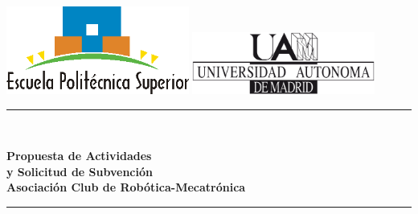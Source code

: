 \documentclass[12pt,twoside]{report}
\date{Marzo de 2016}
\newcommand{\reporttitle}{
	Propuesta de Actividades \\y Solicitud de Subvención
}
\newcommand{\reportauthor}{Asociación Club de Robótica-Mecatrónica}
\begin{document}
\begin{titlepage}

\newcommand{\HRule}{\rule{\linewidth}{1mm}} %



\includegraphics[width = 6cm]{fotos/logo-eps.png}
\hfill
\includegraphics[width = 6cm]{fotos/logo-uam.png}



\center %


\vspace{1cm}



\HRule \\[0.4cm]
\begin{spacing}{1.5}
{ \fontsize{0.8cm}{1em} \bfseries \reporttitle}\\ %
\vspace{0.5cm}
{ \fontsize{0.7cm}{1em} \bfseries \reportauthor} \\
\end{spacing}
\HRule \\[1.5cm]



\end{titlepage}
\end{document}
